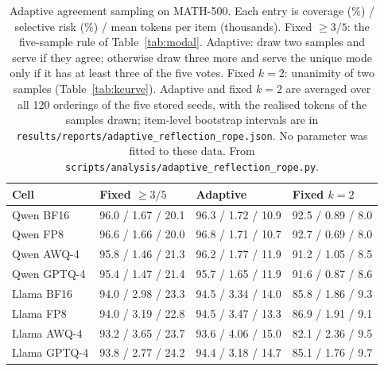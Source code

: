 \documentclass[11pt,a4paper]{article}
\begin{document}
\begin{table}[!htbp]
\centering
\caption{Adaptive agreement sampling on MATH-500. Each entry is coverage (\%) / selective risk (\%) / mean tokens per item (thousands). Fixed $\ge 3/5$: the five-sample rule of Table~\ref{tab:modal}. Adaptive: draw two samples and serve if they agree; otherwise draw three more and serve the unique mode only if it has at least three of the five votes. Fixed $k{=}2$: unanimity of two samples (Table~\ref{tab:kcurve}). Adaptive and fixed $k{=}2$ are averaged over all 120 orderings of the five stored seeds, with the realised tokens of the samples drawn; item-level bootstrap intervals are in \texttt{results/reports/adaptive\_reflection\_rope.json}. No parameter was fitted to these data. From \texttt{scripts/analysis/adaptive\_reflection\_rope.py}.}
\label{tab:adaptive}
\small
\begin{tabular}{llll}
\toprule
\textbf{Cell} & \textbf{Fixed $\ge 3/5$} & \textbf{Adaptive} & \textbf{Fixed $k{=}2$} \\
\midrule
Qwen BF16 & 96.0 / 1.67 / 20.1 & 96.3 / 1.72 / 10.9 & 92.5 / 0.89 / 8.0 \\
Qwen FP8 & 96.6 / 1.66 / 20.0 & 96.8 / 1.71 / 10.7 & 92.7 / 0.69 / 8.0 \\
Qwen AWQ-4 & 95.8 / 1.46 / 21.3 & 96.2 / 1.77 / 11.9 & 91.2 / 1.05 / 8.5 \\
Qwen GPTQ-4 & 95.4 / 1.47 / 21.4 & 95.7 / 1.65 / 11.9 & 91.6 / 0.87 / 8.6 \\
\midrule
Llama BF16 & 94.0 / 2.98 / 23.3 & 94.5 / 3.34 / 14.0 & 85.8 / 1.86 / 9.3 \\
Llama FP8 & 94.0 / 3.19 / 22.8 & 94.5 / 3.47 / 13.3 & 86.9 / 1.91 / 9.1 \\
Llama AWQ-4 & 93.2 / 3.65 / 23.7 & 93.6 / 4.06 / 15.0 & 82.1 / 2.36 / 9.5 \\
Llama GPTQ-4 & 93.8 / 2.77 / 24.2 & 94.4 / 3.18 / 14.7 & 85.1 / 1.76 / 9.7 \\
\bottomrule
\end{tabular}
\end{table}
\end{document}
